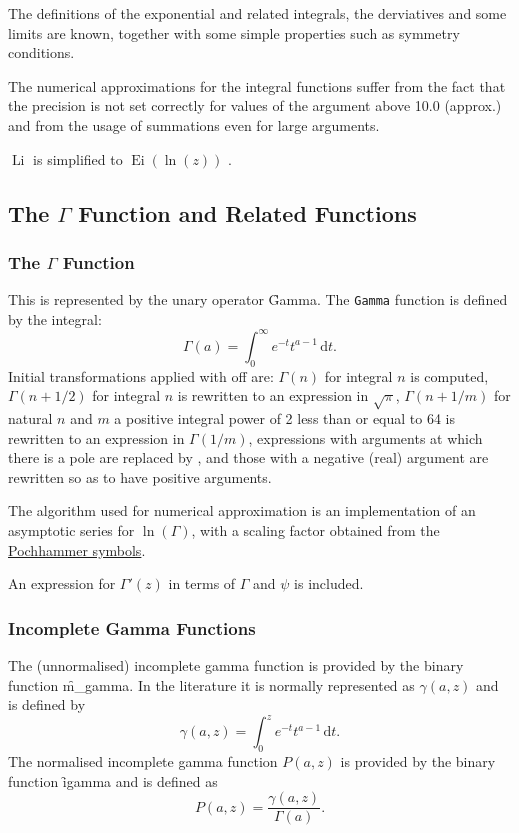The definitions of the exponential and related integrals, the
derviatives and some limits are known, together with some simple
properties such as symmetry conditions.

The numerical approximations for the integral functions suffer
from the fact that the precision is not set correctly for
values of the argument above 10.0 (approx.) and from the
usage of summations even for large arguments.

$\mathop{\mathrm{Li}(z)}$ is simplified to $\mathop{\mathrm{Ei}}(\ln(z))$ .

\subsection{The \texorpdfstring{$\Gamma$}{Gamma} Function and Related Functions}

\subsubsection{The \texorpdfstring{$\Gamma$}{Gamma} Function}
\hypertarget{GAMMF}{}
\hypertarget{operator:GAMMA}{}
\hypertarget{operator:IGAMMA}{}
\hypertarget{operator:POLYGAMMA}{}
\hypertarget{operator:PSI}{}

This is represented by the unary operator \f{Gamma}.
The \texttt{Gamma} function is defined by the integral:
$$ \Gamma(a) = \int_0^\infty e^{-t}t^{a-1}\, \mathrm{d}t.$$
Initial transformations applied with  off are: $\Gamma(n)$ for
integral $n$ is computed, $\Gamma(n+1/2)$ for integral $n$ is rewritten to
an expression in $\sqrt\pi$, $\Gamma(n+1/m)$ for natural $n$ and $m$ a
positive integral power of 2 less than or equal to 64 is rewritten to an
expression in $\Gamma(1/m)$, expressions with arguments at which there is a
pole are replaced by , and those with a negative (real)
argument are rewritten so as to have positive arguments.

The algorithm used for numerical approximation is an implementation of an
asymptotic series for $\ln(\Gamma)$, with a scaling factor obtained from
the \hyperlink{POCH}{Pochhammer symbols}.

An expression for $\Gamma'(z)$ in terms of $\Gamma$ and $\psi$ is
included.

\subsubsection{Incomplete Gamma Functions}
The (unnormalised) incomplete gamma function is provided by the binary function
\f{m\_gamma}. In the literature it is normally represented as $\gamma(a,z)$
and is defined by
$$ \gamma(a, z) = \int_0^z e^{-t}t^{a-1}\, \mathrm{d}t.$$
The normalised incomplete gamma function $P(a,z)$ is provided by the binary
function \f{igamma} and is defined as
$$P(a,z) = \frac{\gamma(a,z)}{\Gamma(a)}.$$
                
